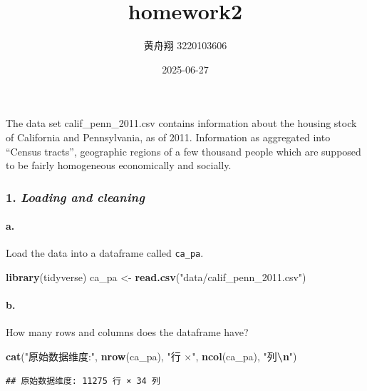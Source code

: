 \documentclass[
]{article}
\title{homework2}
\author{黄舟翔 3220103606}
\date{2025-06-27}
\newenvironment{Shaded}{\begin{snugshade}}{\end{snugshade}}
\newcommand{\FunctionTok}[1]{\textcolor[rgb]{0.13,0.29,0.53}{\textbf{#1}}}
\newcommand{\NormalTok}[1]{#1}
\newcommand{\OtherTok}[1]{\textcolor[rgb]{0.56,0.35,0.01}{#1}}
\newcommand{\SpecialCharTok}[1]{\textcolor[rgb]{0.81,0.36,0.00}{\textbf{#1}}}
\newcommand{\StringTok}[1]{\textcolor[rgb]{0.31,0.60,0.02}{#1}}
\begin{document}
\maketitle

The data set calif\_penn\_2011.csv contains information about the
housing stock of California and Pennsylvania, as of 2011. Information as
aggregated into ``Census tracts'', geographic regions of a few thousand
people which are supposed to be fairly homogeneous economically and
socially.

\subsubsection{\texorpdfstring{1. \emph{Loading and
cleaning}}{1. Loading and cleaning}}\label{loading-and-cleaning}

\paragraph{a.}\label{a.}

Load the data into a dataframe called \texttt{ca\_pa}.

\begin{Shaded}
\begin{Highlighting}[]
\FunctionTok{library}\NormalTok{(tidyverse)}
\NormalTok{ca\_pa }\OtherTok{\textless{}{-}} \FunctionTok{read.csv}\NormalTok{(}\StringTok{"data/calif\_penn\_2011.csv"}\NormalTok{)}
\end{Highlighting}
\end{Shaded}

\paragraph{b.}\label{b.}

How many rows and columns does the dataframe have?

\begin{Shaded}
\begin{Highlighting}[]
\FunctionTok{cat}\NormalTok{(}\StringTok{"原始数据维度:"}\NormalTok{, }\FunctionTok{nrow}\NormalTok{(ca\_pa), }\StringTok{"行 ×"}\NormalTok{, }\FunctionTok{ncol}\NormalTok{(ca\_pa), }\StringTok{"列}\SpecialCharTok{\textbackslash{}n}\StringTok{"}\NormalTok{)}
\end{Highlighting}
\end{Shaded}

\begin{verbatim}
## 原始数据维度: 11275 行 × 34 列
\end{verbatim}
\end{document}
